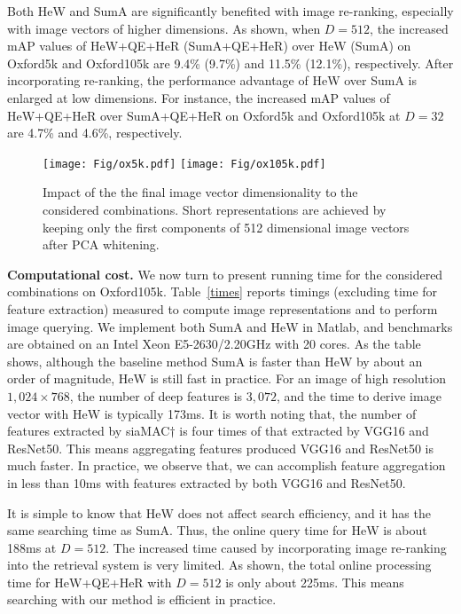 \documentclass[journal]{IEEEtran}
\begin{document}
Both HeW and SumA are significantly benefited with image re-ranking, especially with image vectors of higher dimensions.
As shown, when $D=512$, the increased mAP values of HeW+QE+HeR (SumA+QE+HeR) over HeW (SumA) on Oxford5k and Oxford105k are 9.4\% (9.7\%) and 11.5\% (12.1\%), respectively.
After incorporating re-ranking, the performance advantage of HeW over SumA is enlarged at low dimensions.
For instance, the increased mAP values of HeW+QE+HeR over SumA+QE+HeR on Oxford5k and Oxford105k at $D= 32$  are 4.7\% and 4.6\%, respectively.

\begin{figure}[t]
\centering
\texttt{[image: Fig/ox5k.pdf]}
\texttt{[image: Fig/ox105k.pdf]}
\caption{Impact of the the final image vector dimensionality to the considered combinations. Short representations are achieved by keeping only the first components of 512 dimensional image vectors after PCA whitening.}
\label{fig:dimensions}
\end{figure}

\vspace{0.01in}
\textbf{Computational cost.}
We now turn to present running time for the considered combinations on Oxford105k. Table~\ref{times} reports timings (excluding time for feature extraction) measured to compute image representations and to perform image querying. We implement both SumA and HeW in Matlab, and benchmarks are obtained on an Intel Xeon E5-2630/2.20GHz with 20 cores.
As the table shows, although the baseline method SumA is  faster than HeW by about an order of magnitude, HeW is still fast in practice.
For an image of high resolution $1,024 \times 768$, the number of deep features is $3,072$,  and the time to derive image vector with HeW is typically 173ms. It is worth noting that, the number of features extracted by siaMAC$\dagger$ is four times of that extracted by VGG16 and ResNet50.
This means aggregating features produced VGG16 and ResNet50 is much faster.
In practice, we observe that, we can accomplish feature aggregation in less than 10ms with features extracted by both VGG16 and ResNet50.

It is simple to know that HeW does not affect search efficiency, and it has the same searching time as SumA. Thus, the online query time for HeW is about 188ms at $D=512$.
The increased time caused by incorporating image re-ranking into the retrieval system is very limited. As shown, the total online processing time for HeW+QE+HeR with $D=512$ is only about 225ms. This means searching with our method is efficient in practice.
\end{document}
